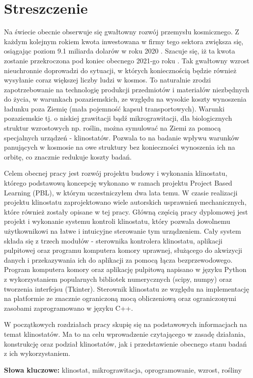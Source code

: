 \chapter*{Streszczenie}

Na świecie obecnie obserwuje się gwałtowny rozwój przemysłu kosmicznego. Z każdym kolejnym
 rokiem kwota inwestowana w firmy tego sektora zwiększa się, osiągając poziom 9.1 miliarda
  dolarów w roku 2020 \cite{bib:kosmos_raport_kwartalny_2021}. Szacuje się, iż ta kwota
   zostanie przekroczona pod koniec obecnego 2021-go roku
    \cite{bib:kosmos_raport_kwartalny_2021}. Tak gwałtowny wzrost nieuchronnie doprowadzi do
     sytuacji, w których koniecznością będzie również wysyłanie coraz większej liczby ludzi
      w kosmos. To naturalnie zrodzi zapotrzebowanie na technologię produkcji przedmiotów i
       materiałów niezbędnych do życia, w warunkach pozaziemskich, ze względu na wysokie
        koszty wynoszenia ładunku poza Ziemię (mała pojemność kapsuł transportowych).
         Warunki pozaziemskie tj. o niskiej grawitacji bądź mikrograwitacji, dla
          biologicznych struktur wzrostowych np. roślin, można symulować na Ziemi za pomocą
           specjalnych urządzeń - klinostatów. Pozwala to na badanie wpływu warunków
            panujących w kosmosie na owe struktury bez konieczności wynoszenia ich na
             orbitę, co znacznie redukuje koszty badań.  

Celem obecnej pracy jest rozwój projektu budowy i wykonania klinostatu, którego podstawową
 koncepcję wykonano w ramach projektu Project Based Learning (PBL), w którym uczestniczyłem
  dwa lata temu. W czasie realizacji projektu klinostatu zaprojektowano wiele autorskich
   usprawnień mechanicznych, które również zostały opisane w tej pracy. Główną częścią pracy
    dyplomowej jest projekt i wykonanie systemu kontroli klinostatu, który pozwala dowolnemu
     użytkownikowi na łatwe i intuicyjne sterowanie tym urządzeniem. Cały system składa się
      z trzech modułów - sterownika kontrolera klinostatu, aplikacji pulpitowej oraz
       programu komputera komory uprawnej, służącego do akwizycji danych i przekazywania ich
        do aplikacji za pomocą łącza bezprzewodowego. Program komputera komory oraz
         aplikację pulpitową napisano w języku Python z wykorzystaniem popularnych bibliotek
          numerycznych (scipy, numpy) oraz tworzenia interfejsu (Tkinter). Sterownik klinostatu ze
           względu na implementację na platformie ze znacznie ograniczoną mocą obliczeniową
            oraz ograniczonymi zasobami zaprogramowano w języku C++. 

W początkowych rozdziałach pracy skupię się na podstawowych informacjach na temat
 klinostatów. Ma to na celu wprowadzenie czytającego w zasadę działania, konstrukcję oraz
  podział klinostatów, jak i przedstawienie obecnego stanu badań z ich wykorzystaniem. 
  

{\bf Słowa kluczowe:} klinostat, mikrograwitacja, oprogramowanie, wzrost, rośliny


